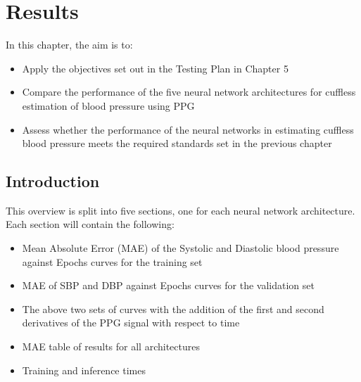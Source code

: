 \section{Results}
In this chapter, the aim is to:
\begin{itemize}
    \item Apply the objectives set out in the Testing Plan in Chapter 5
    \item Compare the performance of the five neural network architectures for cuffless estimation of blood pressure using PPG
    \item Assess whether the performance of the neural networks in estimating cuffless blood pressure meets the required standards set in the previous chapter 
\end{itemize}

\subsection{Introduction}
This overview is split into five sections, one for each neural network architecture. Each section will contain the following: 
\begin{itemize}
    \item Mean Absolute Error (MAE) of the Systolic and Diastolic blood pressure against Epochs curves for the training set
    \item MAE of SBP and DBP against Epochs curves for the validation set
    \item The above two sets of curves with the addition of the first and second derivatives of the PPG signal with respect to time
    \item MAE table of results for all architectures 
    \item Training and inference times
\end{itemize}

